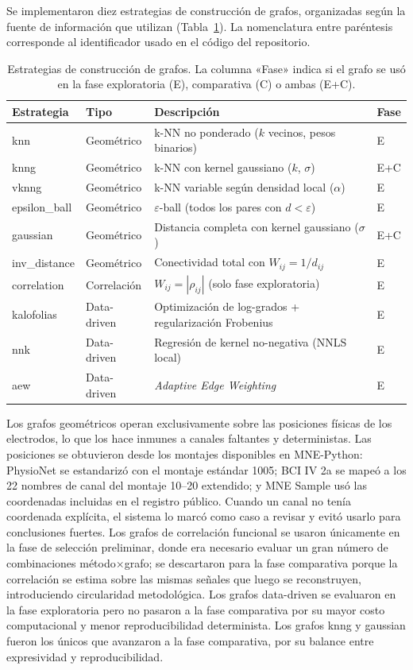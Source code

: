 Se implementaron diez estrategias de construcción de grafos, organizadas según la fuente de información que utilizan (Tabla~\ref{tab:graph_methods}). La nomenclatura entre paréntesis corresponde al identificador usado en el código del repositorio.

\begin{table}[htbp]
\centering
\caption{Estrategias de construcción de grafos. La columna «Fase» indica si el grafo se usó en la fase exploratoria (E), comparativa (C) o ambas (E+C).}
\label{tab:graph_methods}
\small
\begin{tabular}{@{}llp{4.8cm}l@{}}
\toprule
Estrategia & Tipo & Descripción & Fase \\
\midrule
knn & Geométrico & k-NN no ponderado ($k$ vecinos, pesos binarios) & E \\
knng & Geométrico & k-NN con kernel gaussiano ($k$, $\sigma$) & E+C \\
vknng & Geométrico & k-NN variable según densidad local ($\alpha$) & E \\
epsilon\_ball & Geométrico & $\varepsilon$-ball (todos los pares con $d<\varepsilon$) & E \\
gaussian & Geométrico & Distancia completa con kernel gaussiano ($\sigma$) & E+C \\
inv\_distance & Geométrico & Conectividad total con $W_{ij}=1/d_{ij}$ & E \\
correlation & Correlación & $W_{ij}=|\rho_{ij}|$ (solo fase exploratoria) & E \\
kalofolias & Data-driven & Optimización de log-grados + regularización Frobenius & E \\
nnk & Data-driven & Regresión de kernel no-negativa (NNLS local) & E \\
aew & Data-driven & \textit{Adaptive Edge Weighting} & E \\
\bottomrule
\end{tabular}
\end{table}

Los grafos geométricos operan exclusivamente sobre las posiciones físicas de los electrodos, lo que los hace inmunes a canales faltantes y deterministas. Las posiciones se obtuvieron desde los montajes disponibles en MNE-Python: PhysioNet se estandarizó con el montaje estándar 1005; BCI IV 2a se mapeó a los 22 nombres de canal del montaje 10--20 extendido; y MNE Sample usó las coordenadas incluidas en el registro público. Cuando un canal no tenía coordenada explícita, el sistema lo marcó como caso a revisar y evitó usarlo para conclusiones fuertes. Los grafos de correlación funcional se usaron únicamente en la fase de selección preliminar, donde era necesario evaluar un gran número de combinaciones método$\times$grafo; se descartaron para la fase comparativa porque la correlación se estima sobre las mismas señales que luego se reconstruyen, introduciendo circularidad metodológica. Los grafos data-driven se evaluaron en la fase exploratoria pero no pasaron a la fase comparativa por su mayor costo computacional y menor reproducibilidad determinista. Los grafos knng y gaussian fueron los únicos que avanzaron a la fase comparativa, por su balance entre expresividad y reproducibilidad.
